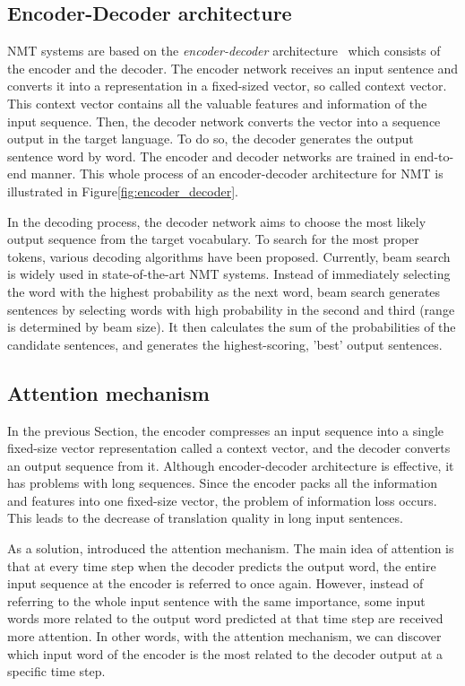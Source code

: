 \subsection{Encoder-Decoder architecture}

NMT systems are based on the \textit{encoder-decoder} architecture~\parencite{sutskever2014sequence} which consists of the encoder and the decoder. The encoder network receives an input sentence and converts it into a representation in a fixed-sized vector, so called context vector. This context vector contains all the valuable features and information of the input sequence. Then, the decoder network converts the vector into a sequence output in the target language. To do so, the decoder generates the output sentence word by word. The encoder and decoder networks are trained in end-to-end manner. This whole process of an encoder-decoder architecture for NMT is illustrated in Figure\ref{fig:encoder_decoder}. 

In the decoding process, the decoder network aims to choose the most likely output sequence from the target vocabulary. To search for the most proper tokens, various decoding algorithms have been proposed. Currently, beam search is widely used in state-of-the-art NMT systems. Instead of immediately selecting the word with the highest probability as the next word, beam search generates sentences by selecting words with high probability in the second and third (range is determined by beam size). It then calculates the sum of the probabilities of the candidate sentences, and generates the highest-scoring, 'best' output sentences.


\subsection{Attention mechanism}


In the previous Section, the encoder compresses an input sequence into a single fixed-size vector representation called a context vector, and the decoder converts an output sequence from it. Although encoder-decoder architecture is effective, it has problems with long sequences. Since the encoder packs all the information and features into one fixed-size vector, the problem of information loss occurs.
This leads to the decrease of translation quality in long input sentences.

As a solution, \cite{bahdanau2014neural} introduced the attention mechanism. The main idea of attention is that at every time step when the decoder predicts the output word, the entire input sequence at the encoder is referred to once again. However, instead of referring to the whole input sentence with the same importance, some input words more related to the output word predicted at that time step are received more attention. In other words, with the attention mechanism, we can discover which input word of the encoder is the most related to the decoder output at a specific time step. 

